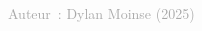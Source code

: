 \documentclass[../main.tex]{subfiles}
\begin{document}
\begin{multicols}{2}
\begin{center}
    \label{isochrone-amiens}
    \vspace{0cm}
    \begin{flushright}
            \scriptsize{\textcolor{darkgray}{Auteur~: Dylan Moinse (2025)}}
    \end{flushright}
\end{center}

    \end{multicols}

    
\end{document}
